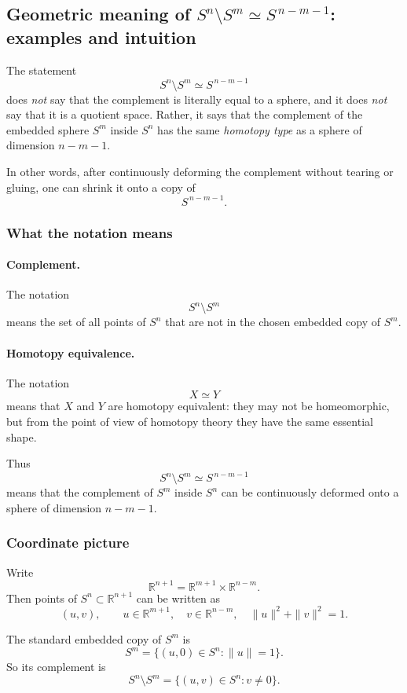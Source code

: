 \documentclass[12pt,a4paper]{article}
\theoremstyle{notespace}
\begin{document}
\subsection{Geometric meaning of \(S^n \setminus S^m \simeq S^{\,n-m-1}\): examples and intuition}

The statement
\[
S^n \setminus S^m \simeq S^{\,n-m-1}
\]
does \emph{not} say that the complement is literally equal to a sphere, and it does \emph{not} say that it is a quotient space. Rather, it says that the complement of the embedded sphere \(S^m\) inside \(S^n\) has the same \emph{homotopy type} as a sphere of dimension \(n-m-1\).

In other words, after continuously deforming the complement without tearing or gluing, one can shrink it onto a copy of
\[
S^{\,n-m-1}.
\]

\subsubsection{What the notation means}

\paragraph{Complement.}
The notation
\[
S^n \setminus S^m
\]
means the set of all points of \(S^n\) that are not in the chosen embedded copy of \(S^m\).

\paragraph{Homotopy equivalence.}
The notation
\[
X \simeq Y
\]
means that \(X\) and \(Y\) are homotopy equivalent: they may not be homeomorphic, but from the point of view of homotopy theory they have the same essential shape.

Thus
\[
S^n \setminus S^m \simeq S^{\,n-m-1}
\]
means that the complement of \(S^m\) inside \(S^n\) can be continuously deformed onto a sphere of dimension \(n-m-1\).

\subsubsection{Coordinate picture}

Write
\[
\mathbb{R}^{n+1}=\mathbb{R}^{m+1}\times \mathbb{R}^{n-m}.
\]
Then points of \(S^n\subset \mathbb{R}^{n+1}\) can be written as
\[
(u,v),
\qquad
u\in \mathbb{R}^{m+1},
\quad
v\in \mathbb{R}^{n-m},
\quad
\|u\|^2+\|v\|^2=1.
\]

The standard embedded copy of \(S^m\) is
\[
S^m
=
\{(u,0)\in S^n : \|u\|=1\}.
\]
So its complement is
\[
S^n \setminus S^m
=
\{(u,v)\in S^n : v\neq 0\}.
\]
\end{document}
